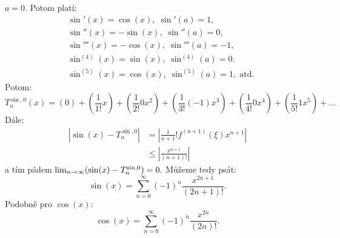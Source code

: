 \begin{example}
    \Necht $a = 0.$ Potom platí:
    \begin{align*}
        &\sin'(x) = \cos(x), \; \sin'(a) = 1, \\
        &\sin''(x) = -\sin(x), \; \sin''(a) = 0, \\
        &\sin'''(x) = -\cos(x), \; \sin'''(a) = -1, \\
        &\sin^{(4)}(x) = \sin(x), \; \sin^{(4)}(a) = 0. \\
        &\sin^{(5)}(x) = \cos(x), \; \sin^{(5)}(a) = 1, \; \text{atd.}
    \end{align*}
    Potom:
    $$T^{\sin,0}_n(x) = (0) + \left(\frac{1}{1!}x\right) 
    + \left(\frac{1}{2!}0x^2 \right) 
    + \left(\frac{1}{3!}(-1)x^3\right) 
    + \left(\frac{1}{4!}0x^4 \right) 
    + \left(\frac{1}{5!}1x^5 \right) 
    + \dots$$
    Dále:
    \begin{align*}
        \left|\sin(x) - T^{\sin,0}_n\right| 
        &= \left|\frac{1}{n+1}!f^{(n+1)}(\xi)x^{n+1}\right| \\
        &\leq \left|\frac{x^{n+1}}{(n+1)!}\right|
    \end{align*}
    a tím pádem $\lim_{n \to \infty} (\sin(x) - T^{\sin,0}_n) = 0.$
    Můžeme tedy psát:
    $$\sin(x) = \sum_{n=0}^{\infty} (-1)^n\frac{x^{2n+1}}{(2n+1)!}.$$
    Podobně pro $\cos(x):$
    $$\cos(x) = \sum_{n=0}^{\infty} (-1)^n\frac{x^{2n}}{(2n)!}.$$
\end{example}

